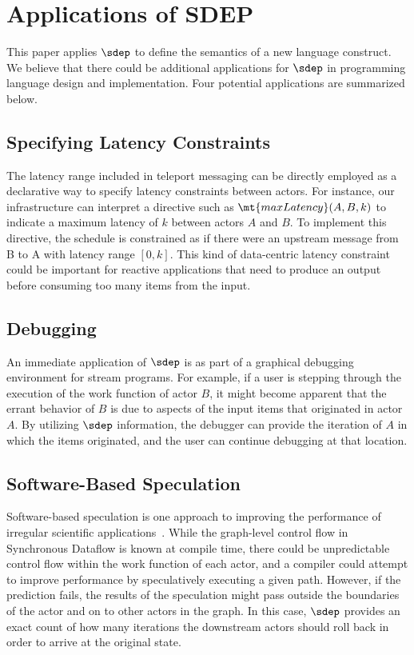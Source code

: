 \section{Applications of SDEP}
\label{sec:others-apps}

This paper applies $\sdep$ to define the semantics of a new language
construct. We believe that there could be additional applications for
$\sdep$ in programming language design and implementation.  Four
potential applications are summarized below.

\subsection{Specifying Latency Constraints}

The latency range included in teleport messaging can be directly
employed as a declarative way to specify latency constraints between
actors.  For instance, our infrastructure can interpret a directive
such as $\mt{maxLatency}(A, B, k)$ to indicate a maximum latency of
$k$ between actors $A$ and $B$.  To implement this directive, the
schedule is constrained as if there were an upstream message from B to
A with latency range $[0,k]$.  This kind of data-centric latency
constraint could be important for reactive applications that need to
produce an output before consuming too many items from the input.

\subsection{Debugging}

An immediate application of $\sdep$ is as part of a graphical
debugging environment for stream programs.  For example, if a user is
stepping through the execution of the work function of actor $B$, it
might become apparent that the errant behavior of $B$ is due to
aspects of the input items that originated in actor $A$.  By utilizing
$\sdep$ information, the debugger can provide the iteration of $A$ in
which the items originated, and the user can continue debugging at
that location.

\subsection{Software-Based Speculation}

Software-based speculation is one approach to improving the
performance of irregular scientific applications~\cite{frank-thesis}.
While the graph-level control flow in Synchronous Dataflow is known at
compile time, there could be unpredictable control flow within the
work function of each actor, and a compiler could attempt to improve
performance by speculatively executing a given path.  However, if the
prediction fails, the results of the speculation might pass outside
the boundaries of the actor and on to other actors in the graph.  In
this case, $\sdep$ provides an exact count of how many iterations the
downstream actors should roll back in order to arrive at the original
state.

